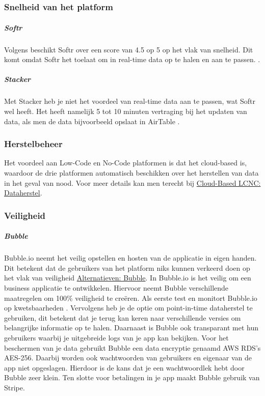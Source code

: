 \chapter{}%
\label{ch:vergelijkende-analyse}
\subsection{Snelheid van het platform}%
\label{subsec:snelheid-van-het-platform}
\paragraph{Softr}
Volgens \textcite{Code2023} 
beschikt Softr over een score van 4.5 op 5 op het vlak van snelheid. 
Dit komt omdat Softr het toelaat om in real-time data op te halen en aan te passen. \autocite{Youssef2023}.
\paragraph{Stacker}
Met Stacker heb je niet het voordeel van real-time data aan te passen, wat Softr wel heeft.
 Het heeft namelijk 5 tot 10 minuten vertraging bij het updaten van data, als men de data bijvoorbeeld opslaat in AirTable \autocite{Youssef2023}.

\subsection{Herstelbeheer}%
\label{subsec:herstelbeheer}
Het voordeel aan Low-Code en No-Code platformen is dat het cloud-based is, waardoor de drie platformen automatisch beschikken over het herstellen van data in het geval van nood. 
Voor meer details kan men terecht bij \hyperref[subsec:cloud-based-lcnc]{Cloud-Based LCNC: Dataherstel}.
\subsection{Veiligheid}%
\label{subsec:veiligheid}
\paragraph{Bubble}
Bubble.io neemt het veilig opstellen en hosten van de applicatie in eigen handen. Dit betekent dat de gebruikers van het platform niks kunnen verkeerd doen op het vlak van veiligheid \hyperref[subsec:bubble]{Alternatieven: Bubble}.
In Bubble.io is het veilig om een business applicatie te ontwikkelen. Hiervoor neemt Bubble verschillende maatregelen om 100\% veiligheid te creëren. 
Als eerste test en monitort Bubble.io op kwetsbaarheden \autocite{Agency2023}. Vervolgens heb je de optie om point-in-time dataherstel te gebruiken, dit betekent dat je terug kan keren naar verschillende versies om belangrijke informatie op te halen. Daarnaast is Bubble ook transparant met hun gebruikers waarbij je uitgebreide logs van je app kan bekijken. Voor het beschermen van je data gebruikt Bubble een data encryptie genaamd AWS RDS’s AES-256. Daarbij worden ook wachtwoorden van gebruikers en eigenaar van de app niet opgeslagen. Hierdoor is de kans dat je een wachtwoordlek hebt door Bubble zeer klein. Ten slotte voor betalingen in je app maakt Bubble gebruik van Stripe.
